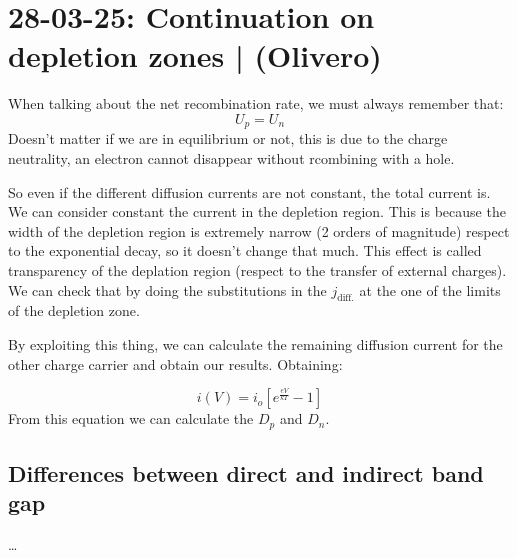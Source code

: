 \section{28-03-25: Continuation on depletion zones | (Olivero)}

When talking about the net recombination rate, we must always remember that:
\begin{equation}
    U_p = U_n
\end{equation}
Doesn't matter if we are in equilibrium or not, this is due to the charge neutrality, an electron cannot disappear without rcombining with a hole.

So even if the different diffusion currents are not constant, the total current is. We can consider constant the current in the depletion region. This is because the width of the depletion region is extremely narrow (2 orders of magnitude) respect to the exponential decay, so it doesn't change that much. This effect is called transparency of the deplation region (respect to the transfer of external charges). We can check that by doing the substitutions in the $j_{\text{diff.}}$ at the one of the limits of the depletion zone.

By exploiting this thing, we can calculate the remaining diffusion current for the other charge carrier and obtain our results. Obtaining:

\begin{equation}
    i(V) = i_o \left[e^{\frac{eV}{kT}} - 1\right]
\end{equation}
From this equation we can calculate the $D_p$ and $D_n$.

\subsection{Differences between direct and indirect band gap}
\dots
